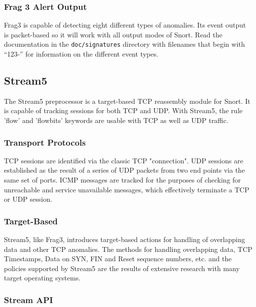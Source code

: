 \documentclass[english]{report}
\begin{document}
\subsubsection{Frag 3 Alert Output}
\label{frag3 alert output}

Frag3 is capable of detecting eight different types of anomalies.  Its event
output is packet-based so it will work with all output modes of Snort.  Read
the documentation in the \texttt{doc/signatures} directory with filenames that
begin with ``123-'' for information on the different event types.


\subsection{Stream5}
\label{stream5 section}

The Stream5 preprocessor is a target-based TCP reassembly module for Snort.  It
is capable of tracking sessions for both TCP and UDP.  With Stream5, the rule
'flow' and 'flowbits' keywords are usable with TCP as well as UDP traffic.

\subsubsection{Transport Protocols}

TCP sessions are identified via the classic TCP "connection".  UDP sessions are
established as the result of a series of UDP packets from two end points via
the same set of ports.  ICMP messages are tracked for the purposes of checking
for unreachable and service unavailable messages, which effectively terminate a
TCP or UDP session.

\subsubsection{Target-Based}

Stream5, like Frag3, introduces target-based actions for handling of
overlapping data and other TCP anomalies.  The methods for handling overlapping
data, TCP Timestamps, Data on SYN, FIN and Reset sequence numbers, etc. and the
policies supported by Stream5 are the results of extensive research with many
target operating systems.

\subsubsection{Stream API}
\end{document}

